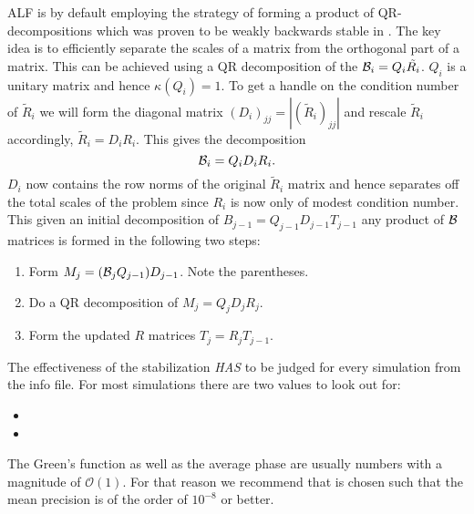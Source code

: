 ALF is by default employing
the strategy of forming a product of QR-decompositions which was proven to be weakly backwards stable in \cite{Bai2011}.
The key idea is to efficiently separate the scales of a matrix from the orthogonal part of a matrix.
This can be achieved using a QR decomposition of the ${\cal B}_i = Q_i \tilde{R_i}$. $Q_i$ is a unitary matrix and hence $\kappa(Q_i) = 1$.
To get a handle on the condition number of $\tilde{R}_i$ we will form the
diagonal matrix $(D_i)_{jj} = |(\tilde{R}_i)_{jj}|$ and rescale $\tilde{R}_i$ accordingly, $\tilde{R}_i = D_i R_i$.
This gives the decomposition
\begin{equation}
{\cal B}_i = Q_i D_i R_i.
\end{equation}
$D_i$ now contains the row norms of the original $\tilde{R}_i$ matrix and hence separates off the total scales of the problem since $R_i$ is now only of modest condition number.  
This given an initial decomposition of $B_{j-1} = Q_{j-1} D_{j-1} T_{j-1}$ any product 
of ${\cal B}$ matrices is formed in the following two steps:
\begin{enumerate}
\item Form $ M_j = ({\cal B}_j Q_{j-1}) D_{j-1}$. Note the parentheses.
\item Do a QR decomposition of $M_j = Q_j D_j R_j$.
\item Form the updated $R$ matrices $T_j = R_j T_{j-1}$.
\end{enumerate}
The effectiveness of the stabilization \emph{HAS} to be judged for every simulation from the info
file. For most simulations there are two values to look out for:
\begin{itemize}
\item {}
\item {}
\end{itemize}
The Green's function as well as the average phase are usually numbers with a magnitude of $\mathcal{O} (1)$. 
For that reason we recommend that  is chosen such that the mean precision is  of the order of $10^{-8}$  or better.  
